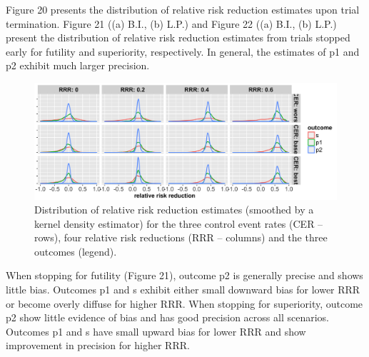 \documentclass[]{article}
\begin{document}
Figure 20 presents the distribution of relative risk reduction estimates
upon trial termination. Figure 21 ((a) B.I., (b) L.P.) and Figure 22
((a) B.I., (b) L.P.) present the distribution of relative risk reduction
estimates from trials stopped early for futility and superiority,
respectively. In general, the estimates of p1 and p2 exhibit much larger
precision.

\begin{figure}
  \caption{Distribution of relative risk reduction estimates (smoothed by a kernel density estimator) for the three
  control event rates (CER – rows), four relative risk reductions (RRR – columns) and the three outcomes (legend).}
  \includegraphics{../plots/3arm/RRRhat_3arm.png}
\end{figure}

When stopping for futility (Figure 21), outcome p2 is generally precise
and shows little bias. Outcomes p1 and s exhibit either small downward
bias for lower RRR or become overly diffuse for higher RRR. When
stopping for superiority, outcome p2 show little evidence of bias and
has good precision across all scenarios. Outcomes p1 and s have small
upward bias for lower RRR and show improvement in precision for higher
RRR.
\end{document}
